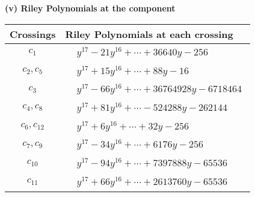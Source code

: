 \documentclass[1p]{elsarticle_modified}
\theoremstyle{definition}
\begin{document}
\newpage\renewcommand{\arraystretch}{1}
\flushleft \textbf{(v) Riley Polynomials at the component}\newline \\
\begin{tabular}{m{50pt}|m{274pt}}
Crossings & \hspace{64pt}Riley Polynomials at each crossing \\
\hline $$\begin{aligned}c_{1}\end{aligned}$$&$\begin{aligned}
&y^{17}-21 y^{16}+\cdots+36640 y-256
\end{aligned}$\\
\hline $$\begin{aligned}c_{2},c_{5}\end{aligned}$$&$\begin{aligned}
&y^{17}+15 y^{16}+\cdots+88 y-16
\end{aligned}$\\
\hline $$\begin{aligned}c_{3}\end{aligned}$$&$\begin{aligned}
&y^{17}-66 y^{16}+\cdots+36764928 y-6718464
\end{aligned}$\\
\hline $$\begin{aligned}c_{4},c_{8}\end{aligned}$$&$\begin{aligned}
&y^{17}+81 y^{16}+\cdots-524288 y-262144
\end{aligned}$\\
\hline $$\begin{aligned}c_{6},c_{12}\end{aligned}$$&$\begin{aligned}
&y^{17}+6 y^{16}+\cdots+32 y-256
\end{aligned}$\\
\hline $$\begin{aligned}c_{7},c_{9}\end{aligned}$$&$\begin{aligned}
&y^{17}-34 y^{16}+\cdots+6176 y-256
\end{aligned}$\\
\hline $$\begin{aligned}c_{10}\end{aligned}$$&$\begin{aligned}
&y^{17}-94 y^{16}+\cdots+7397888 y-65536
\end{aligned}$\\
\hline $$\begin{aligned}c_{11}\end{aligned}$$&$\begin{aligned}
&y^{17}+66 y^{16}+\cdots+2613760 y-65536
\end{aligned}$\\
\hline
\end{tabular}\\~\\
\end{document}

